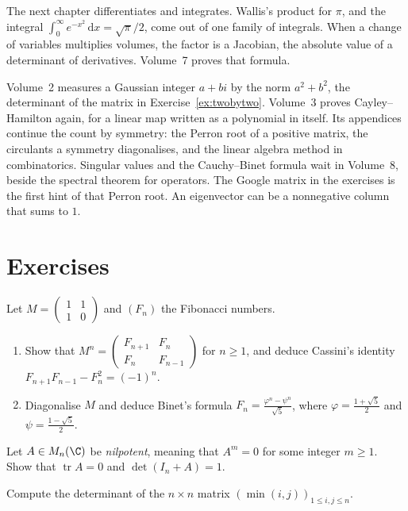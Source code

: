 The next chapter differentiates and integrates. Wallis's product for $\pi$, and the integral $\int_0^\infty e^{-x^2}\,\mathrm dx=\sqrt\pi/2$, come out of one family of integrals. When a change of variables multiplies volumes, the factor is a Jacobian, the absolute value of a determinant of derivatives. Volume~7 proves that formula.

Volume~2 measures a Gaussian integer $a+bi$ by the norm $a^2+b^2$, the determinant of the matrix in Exercise~\ref{ex:twobytwo}. Volume~3 proves Cayley--Hamilton again, for a linear map written as a polynomial in itself. Its appendices continue the count by symmetry: the Perron root of a positive matrix, the circulants a symmetry diagonalises, and the linear algebra method in combinatorics. Singular values and the Cauchy--Binet formula wait in Volume~8, beside the spectral theorem for operators. The Google matrix in the exercises is the first hint of that Perron root. An eigenvector can be a nonnegative column that sums to $1$.

\section{Exercises}
\begin{exercise}[$\star$]\label{ex:fibmat}
Let $M=\begin{pmatrix}1&1\\1&0\end{pmatrix}$ and $(F_n)$ the Fibonacci numbers.
\begin{enumerate}[label=(\alph*)]
\item Show that $M^n=\begin{pmatrix}F_{n+1}&F_n\\F_n&F_{n-1}\end{pmatrix}$ for $n\ge1$, and deduce Cassini's identity $F_{n+1}F_{n-1}-F_n^2=(-1)^n$.
\item Diagonalise $M$ and deduce Binet's formula $F_n=\frac{\varphi^n-\psi^n}{\sqrt5}$, where $\varphi=\frac{1+\sqrt5}2$ and $\psi=\frac{1-\sqrt5}2$.
\end{enumerate}
\end{exercise}

\begin{exercise}[$\star$]\label{ex:nilp}
Let $A\in M_n(\C)$ be \emph{nilpotent}, meaning that $A^m=0$ for some integer $m\ge1$. Show that $\operatorname{tr}A=0$ and $\det(I_n+A)=1$.
\end{exercise}

\begin{exercise}[$\star$]\label{ex:mindet}
Compute the determinant of the $n\times n$ matrix $\left(\min(i,j)\right)_{1\le i,j\le n}$.
\end{exercise}

